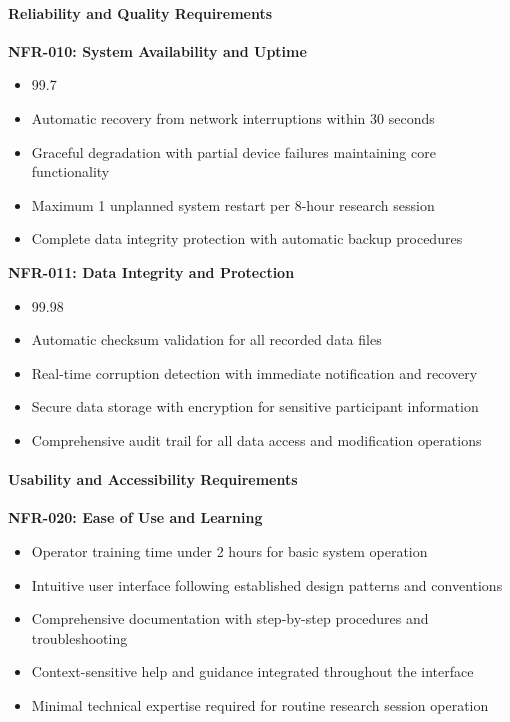 \documentclass[12pt,a4paper]{report}
\begin{document}
\paragraph{Reliability and Quality Requirements}

\textbf{NFR-010: System Availability and Uptime}

\begin{itemize}
\item 99.7%
\item Automatic recovery from network interruptions within 30 seconds
\item Graceful degradation with partial device failures maintaining core functionality
\item Maximum 1 unplanned system restart per 8-hour research session
\item Complete data integrity protection with automatic backup procedures

\end{itemize}
\textbf{NFR-011: Data Integrity and Protection}

\begin{itemize}
\item 99.98%
\item Automatic checksum validation for all recorded data files
\item Real-time corruption detection with immediate notification and recovery
\item Secure data storage with encryption for sensitive participant information
\item Comprehensive audit trail for all data access and modification operations

\end{itemize}
\paragraph{Usability and Accessibility Requirements}

\textbf{NFR-020: Ease of Use and Learning}

\begin{itemize}
\item Operator training time under 2 hours for basic system operation
\item Intuitive user interface following established design patterns and conventions
\item Comprehensive documentation with step-by-step procedures and troubleshooting
\item Context-sensitive help and guidance integrated throughout the interface
\item Minimal technical expertise required for routine research session operation

\end{itemize}
\end{document}
